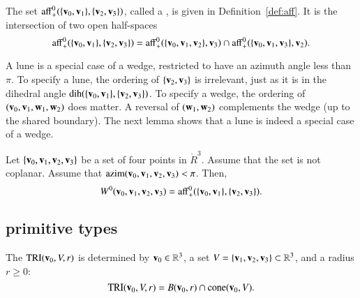 \begin{definition}[lune]\label{def:lune}
  The set ${\operatorname{aff}}^0_+(\{{\mathbf v}_0,{\mathbf v}_1\},\{{\mathbf v}_2,{\mathbf v}_3\})$, called a
  , is given in Definition~\ref{def:aff}.  It is the
  intersection of two open half-spaces
\[ 
{\operatorname{aff}}^0_+(\{{\mathbf v}_0,{\mathbf v}_1\},\{{\mathbf v}_2,{\mathbf v}_3\})
={\operatorname{aff}}^0_+(\{{\mathbf v}_0,{\mathbf v}_1,{\mathbf v}_2\},{\mathbf v}_3)\cap
{\operatorname{aff}}^0_+(\{{\mathbf v}_0,{\mathbf v}_1,{\mathbf v}_3\},{\mathbf v}_2).
\] 
\end{definition}

A lune is a special case of a wedge, restricted to have an azimuth
angle less than $\pi$.  To specify a lune, the ordering of
$\{{\mathbf v}_2,{\mathbf v}_3\}$ is irrelevant, just as it is in the dihedral angle
$\operatorname{dih}(\{{\mathbf v}_0,{\mathbf v}_1\},\{{\mathbf v}_2,{\mathbf v}_3\})$.  To specify a wedge, the ordering
of $({\mathbf v}_0,{\mathbf v}_1,{\mathbf w}_1,{\mathbf w}_2)$ does matter.  A reversal of $({\mathbf w}_1,{\mathbf w}_2)$
complements the wedge (up to the shared boundary).  The next lemma
shows that a lune is indeed a special case of a wedge.
%
%
%
%
%
%

\begin{lemma} 
  Let $\{{\mathbf v}_0,{\mathbf v}_1,{\mathbf v}_2,{\mathbf v}_3\}$ be a set of four points in
  $\ring{R}^3$.  Assume that the set is not coplanar.  Assume that
  ${\operatorname{azim}}({\mathbf v}_0,{\mathbf v}_1,{\mathbf v}_2,{\mathbf v}_3)<\pi$.  Then,
\[ W^0({\mathbf v}_0,{\mathbf v}_1,{\mathbf v}_2,{\mathbf v}_3) =
{\operatorname{aff}}^0_+(\{{\mathbf v}_0,{\mathbf v}_1\},\{{\mathbf v}_2,{\mathbf v}_3\}).\] 
%
\end{lemma}


\subsection{primitive types}
%

\begin{definition}
 The 
${\operatorname{TRI}}({\mathbf v}_0,V,r)$ is determined by ${\mathbf v}_0\in\mathbb{R}^3$, a 
set $V=\{{\mathbf v}_1,{\mathbf v}_2,{\mathbf v}_3\}\subset\mathbb{R}^3$, and a radius $r\ge0$:
\[ 
{\operatorname{TRI}}({\mathbf v}_0,V,r) = 
B({\mathbf v}_0,r)\cap {\operatorname{cone}}({\mathbf v}_0,V).
\] 
%
%
%
\end{definition}



